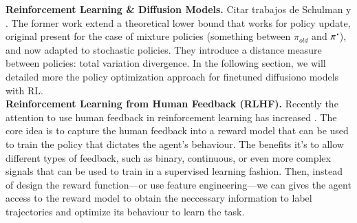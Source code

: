 \noindent\textbf{Reinforcement Learning \& Diffusion Models.} Citar trabajos de Schulman \citep{schulman2015trust} y \citep{schulman2017proximal}. The former work extend a theoretical lower bound that works for policy update, original present for the case of mixture policies (something between $\pi_{old}$ and $\pi`$), and now adapted to stochastic policies. They introduce a distance measure between policies: total variation divergence. In the following section, we will detailed more the policy optimization approach for finetuned diffusiono models with RL.\\

\noindent\textbf{Reinforcement Learning from Human Feedback (RLHF).} Recently the attention to use human feedback in reinforcement learning has increased \cite{kaufmann2023survey}. The core idea is to capture the human feedback into a reward model that can be used to train the policy that dictates the agent's behaviour. The benefits it's to allow different types of feedback, such as binary, continuous, or even more complex signals that can be used to train in a supervised learning fashion. Then, instead of design the reward function---or use feature engineering---we can gives the agent access to the reward model to obtain the neccessary information to label trajectories and optimize its behaviour to learn the task. \\


